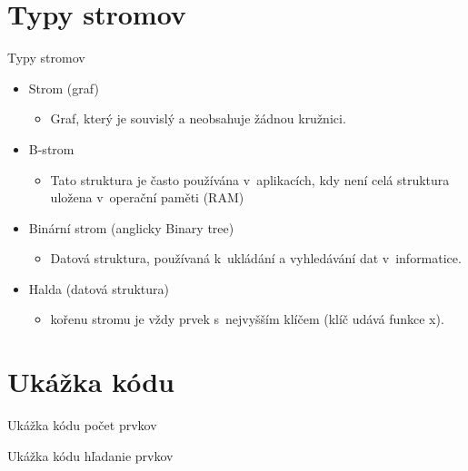 \documentclass[10pt, hyperref={unicode}]{beamer}
\begin{document}
\section{Typy stromov}
\begin{frame}{Typy stromov}
            \begin{itemize}
				\item Strom (graf)
				\begin{itemize}
				    \item  Graf, který je souvislý a neobsahuje žádnou kružnici.
				\end{itemize}
				
				
				\item B-strom
				\begin{itemize}
				    \item  Tato struktura je často používána v~aplikacích, 
				    kdy není celá struktura uložena v~operační paměti (RAM)
				\end{itemize}
			
				
				\item Binární strom (anglicky Binary tree)
				\begin{itemize}
				    \item Datová struktura, používaná k~ukládání a vyhledávání dat v~informatice.
				\end{itemize}
				
				
				\item Halda (datová struktura)
				\begin{itemize}
				    \item   kořenu stromu je vždy prvek s~nejvyšším klíčem (klíč udává funkce x).
				\end{itemize}
			\end{itemize}
\end{frame}

\label{kod1}
\section{Ukážka kódu}
\begin{frame}{Ukážka kódu počet prvkov}
        
\end{frame}

\label{kod2}

\begin{frame}{Ukážka kódu hľadanie prvkov}
        
\end{frame}
\end{document}
